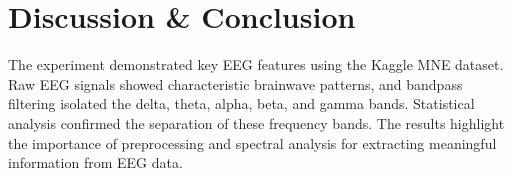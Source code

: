 \documentclass[a4paper,11pt]{article}
\begin{document}

\section*{Discussion \& Conclusion}
The experiment demonstrated key EEG features using the Kaggle MNE dataset. Raw EEG signals showed characteristic brainwave patterns, and bandpass filtering isolated the delta, theta, alpha, beta, and gamma bands. Statistical analysis confirmed the separation of these frequency bands. The results highlight the importance of preprocessing and spectral analysis for extracting meaningful information from EEG data.


\renewcommand{\bibname}{References}

\end{document}
